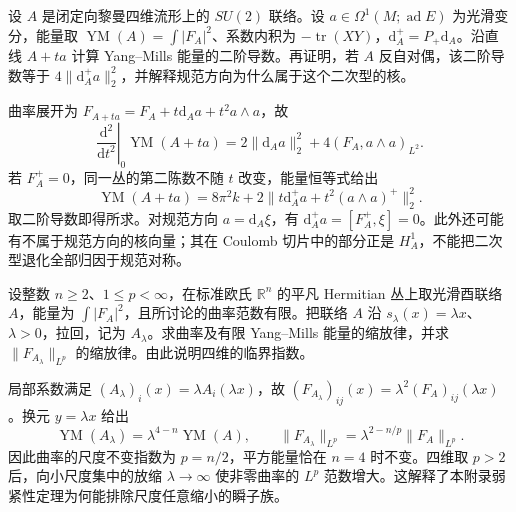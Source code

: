 \BookExercises

\begin{exercise}\label{g3:ex:B-yang-mills-hessian}
 设 \(A\) 是闭定向黎曼四维流形上的 \(SU(2)\) 联络。设 \(a\in\Omega^1(M;\operatorname{ad}E)\) 为光滑变分，能量取 \(\operatorname{YM}(A)=\int|F_A|^2\)、系数内积为 \(-\operatorname{tr}(XY)\)，\(\mathrm d_A^+=P_+\mathrm d_A\)。沿直线 \(A+ta\) 计算 Yang--Mills 能量的二阶导数。再证明，若 \(A\) 反自对偶，该二阶导数等于 \(4\|\mathrm d_A^+a\|_2^2\)，并解释规范方向为什么属于这个二次型的核。
\end{exercise}
\begin{solution}
 曲率展开为 \(F_{A+ta}=F_A+t\mathrm d_Aa+t^2a\wedge a\)，故
 \[
  \left.\frac{\mathrm d^2}{\mathrm dt^2}\right|_0\operatorname{YM}(A+ta)
   =2\|\mathrm d_Aa\|_2^2+4(F_A,a\wedge a)_{L^2}.
 \]
 若 \(F_A^+=0\)，同一丛的第二陈数不随 \(t\) 改变，能量恒等式给出
 \[
  \operatorname{YM}(A+ta)
    =8\pi^2k+2\|t\mathrm d_A^+a+t^2(a\wedge a)^+\|_2^2.
 \]
 取二阶导数即得所求。对规范方向 \(a=\mathrm d_A\xi\)，有
 \(\mathrm d_A^+a=[F_A^+,\xi]=0\)。此外还可能有不属于规范方向的核向量；其在 Coulomb 切片中的部分正是 \(H_A^1\)，不能把二次型退化全部归因于规范对称。
\end{solution}

\begin{exercise}\label{g3:ex:B-energy-scaling}
 设整数 \(n\ge2\)、\(1\le p<\infty\)，在标准欧氏 \(\mathbb R^n\) 的平凡 Hermitian 丛上取光滑酉联络 \(A\)，能量为 \(\int|F_A|^2\)，且所讨论的曲率范数有限。把联络 \(A\) 沿 \(s_\lambda(x)=\lambda x\)、\(\lambda>0\)，拉回，记为 \(A_\lambda\)。求曲率及有限 Yang--Mills 能量的缩放律，并求 \(\|F_{A_\lambda}\|_{L^p}\) 的缩放律。由此说明四维的临界指数。
\end{exercise}
\begin{solution}
 局部系数满足 \((A_\lambda)_i(x)=\lambda A_i(\lambda x)\)，故
 \((F_{A_\lambda})_{ij}(x)=\lambda^2(F_A)_{ij}(\lambda x)\)。换元 \(y=\lambda x\) 给出
 \[
  \operatorname{YM}(A_\lambda)=\lambda^{4-n}\operatorname{YM}(A),
  \qquad
  \|F_{A_\lambda}\|_{L^p}=\lambda^{2-n/p}\|F_A\|_{L^p}.
 \]
 因此曲率的尺度不变指数为 \(p=n/2\)，平方能量恰在 \(n=4\) 时不变。四维取 \(p>2\) 后，向小尺度集中的放缩 \(\lambda\to\infty\) 使非零曲率的 \(L^p\) 范数增大。这解释了本附录弱紧性定理为何能排除尺度任意缩小的瞬子族。
\end{solution}

